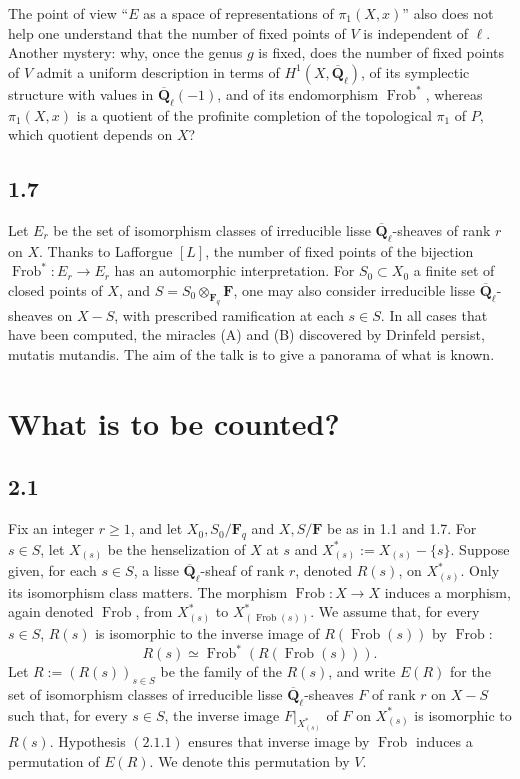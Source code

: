 \documentclass[11pt]{article}
\newcommand{\Qbar}{\overline{\mathbf Q}}
\newcommand{\Fq}{\mathbf F_q}
\newcommand{\F}{\mathbf F}
\newcommand{\Frob}{\operatorname{Frob}}
\begin{document}
The point of view ``\(E\) as a space of representations of \(\pi_1(X,x)\)'' also does not help one understand that the number of fixed points of \(V\) is independent of \(\ell\). Another mystery: why, once the genus \(g\) is fixed, does the number of fixed points of \(V\) admit a uniform description in terms of \(H^1(X,\Qbar_\ell)\), of its symplectic structure with values in \(\Qbar_\ell(-1)\), and of its endomorphism \(\Frob^*\), whereas \(\pi_1(X,x)\) is a quotient of the profinite completion of the topological \(\pi_1\) of \(P\), which quotient depends on \(X\)?

\subsection{1.7}
Let \(E_r\) be the set of isomorphism classes of irreducible lisse \(\Qbar_\ell\)-sheaves of rank \(r\) on \(X\). Thanks to Lafforgue \([L]\), the number of fixed points of the bijection \(\Frob^*:E_r\to E_r\) has an automorphic interpretation. For \(S_0\subset X_0\) a finite set of closed points of \(X\), and \(S=S_0\otimes_{\Fq}\F\), one may also consider irreducible lisse \(\Qbar_\ell\)-sheaves on \(X-S\), with prescribed ramification at each \(s\in S\). In all cases that have been computed, the miracles (A) and (B) discovered by Drinfeld persist, mutatis mutandis. The aim of the talk is to give a panorama of what is known.

\section{What is to be counted?}

\subsection{2.1}
Fix an integer \(r\ge 1\), and let \(X_0,S_0/\Fq\) and \(X,S/\F\) be as in 1.1 and 1.7. For \(s\in S\), let \(X_{(s)}\) be the henselization of \(X\) at \(s\) and \(X^*_{(s)}:=X_{(s)}-\{s\}\). Suppose given, for each \(s\in S\), a lisse \(\Qbar_\ell\)-sheaf of rank \(r\), denoted \(R(s)\), on \(X^*_{(s)}\). Only its isomorphism class matters. The morphism \(\Frob:X\to X\) induces a morphism, again denoted \(\Frob\), from \(X^*_{(s)}\) to \(X^*_{(\Frob(s))}\). We assume that, for every \(s\in S\), \(R(s)\) is isomorphic to the inverse image of \(R(\Frob(s))\) by \(\Frob\):
\begin{equation}\tag{2.1.1}
R(s)\simeq \Frob^*(R(\Frob(s))).
\end{equation}
Let \(R:=(R(s))_{s\in S}\) be the family of the \(R(s)\), and write \(E(R)\) for the set of isomorphism classes of irreducible lisse \(\Qbar_\ell\)-sheaves \(F\) of rank \(r\) on \(X-S\) such that, for every \(s\in S\), the inverse image \(F|_{X^*_{(s)}}\) of \(F\) on \(X^*_{(s)}\) is isomorphic to \(R(s)\). Hypothesis \((2.1.1)\) ensures that inverse image by \(\Frob\) induces a permutation of \(E(R)\). We denote this permutation by \(V\).
\end{document}
